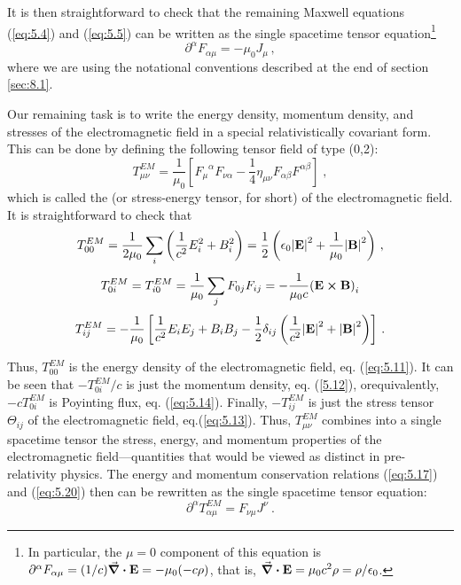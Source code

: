 It is then straightforward to check that the remaining Maxwell equations (\ref{eq:5.4}) and (\ref{eq:5.5}) can be written as the single spacetime tensor equation\footnote{In particular, the $\mu = 0$ component of this equation is $\partial^\alpha F_{\alpha\mu} = (1/c) \div{\vb{E}} = -\mu_0 (-c\rho)$, that is, $\div{\vb{E}} = \mu_0 c^2\rho = \rho/\epsilon_0$.}
\begin{equation}\label{eq:8.49}
\partial^\alpha F_{\alpha\mu} = -\mu_0 J_\mu\,,
\end{equation}
where we are using the notational conventions described at the end of section \ref{sec:8.1}.

Our remaining task is to write the energy density, momentum density, and stresses of the electromagnetic field in a special relativistically covariant form. This can be done by defining the following tensor field of type (0,2):
\begin{equation}\label{eq:8.50}
T_{\mu\nu}^{EM} = \frac{1}{\mu_0} \left[{F_\mu}^\alpha F_{\nu\alpha} - \frac{1}{4} \eta_{\mu\nu} F_{\alpha\beta} F^{\alpha\beta}        \right] \;,
\end{equation}
which is called the  (or stress-energy tensor, for short) of the electromagnetic field. It is straightforward to check that
\begin{equation}\label{eq:8.51}
T_{0 0}^{EM} = \frac{1}{2 \mu_0} \sum_i \left(\frac{1}{c^2} E_i^2 + B_i^2 \right) = \frac{1}{2}  \left(\epsilon_0 \abs{\vb{E}}^2 + \frac{1}{\mu_0} \abs{\vb{B}}^2  \right)\,, 
\end{equation}
\begin{equation}\label{eq:8.52}
T_{0 i}^{EM} = T_{i 0}^{EM} = \frac{1}{\mu_0} \sum_j F_{0 j} F_{i j} = - \frac{1}{\mu_0 c} {(\vb{E} \cross \vb{B})}_i
\end{equation}
\begin{equation}\label{eq:8.53}
T_{i j}^{EM} = - \frac{1}{\mu_0} \left[\frac{1}{c^2} E_i E_j + B_i B_j -\frac{1}{2} \delta_{ij} \left(\frac{1}{c^2}  \abs{\vb{E}}^2 + \abs{\vb{B}}^2\right)\right]\,.
\end{equation}

Thus, $T_{0 0}^{EM}$ is the energy density of the electromagnetic field, eq. (\ref{eq:5.11}). 
It can be seen that $- T_{0 i}^{EM}/c$ is just the momentum density, eq. (\ref{5.12}), orequivalently, 
$-c T_{0 i}^{EM}$ is Poyinting flux, eq. (\ref{eq:5.14}). Finally,  $-T_{i j}^{EM}$ is just the stress tensor
$\Theta_{ij}$ of the electromagnetic field, eq.(\ref{eq:5.13}). Thus, $T^{EM}_{\mu\nu}$ combines into a single spacetime tensor the stress, energy, and momentum properties of the electromagnetic field---quantities that would be viewed as distinct in pre-relativity physics. The energy and momentum conservation relations (\ref{eq:5.17}) and 
(\ref{eq:5.20}) then can be rewritten as the single spacetime tensor equation:
\begin{equation}\label{eq:8.54}
\partial^\alpha T^{EM}_{\alpha \mu} = F_{\nu \mu} J^\nu\:.
\end{equation}

